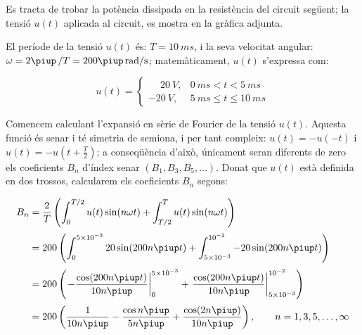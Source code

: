 \begin{exemple}\label{ex:fourier}
     Es tracta de trobar la potència
     dissipada en la resistència del circuit següent; la tensió $u(t)$ aplicada al circuit,
     es mostra en la gràfica adjunta.

    \begin{center}
        
    \end{center}

     El període de la tensió $u(t)$ és: $T=\qty{10}{ms}$, i la
    seva velocitat angular: $\omega = 2\piup\,/T = 200\piup\unit{\,rad/s}$;
    matemàticament, $u(t)$ s'expressa com:

    \[
    u(t) = \begin{cases} \phantom{-}\qty{20}{V}, & \qty{0}{ms} < t < \qty{5}{ms} \\
           \qty{-20}{V}, & \qty{5}{ms} \leq t \leq \qty{10}{ms} \end{cases}
    \]

    Comencem calculant l'expansió en sèrie de Fourier de la tensió
    $u(t)$. Aquesta funció és senar i té simetria de semiona, i per tant
     compleix: $u(t)=-u(-t)$ i $u(t) = -u(t+\frac{T}{2})$; a conseqüència   d'això, únicament seran diferents de zero els coeficients $B_n$ d'índex senar $(B_1,B_3,B_5,\ldots)$. Donat que
    $u(t)$ està definida en dos trossos, calcularem els coeficients
    $B_n$ segons:

    \[
    \begin{split}
        B_n &= \frac{2}{T} \left( \int_0^{T/2} u(t) \sin(n \omega t) +
        \int_{T/2}^{T} u(t) \sin(n \omega t) \right) \\[0.5ex]
        &= 200 \left( \int_0^{5\times 10^{-3}} 20 \sin(200 n \piup t) +
        \int_{5\times 10^{-3}}^{10^{-2}} -20 \sin(200 n \piup t) \right) \\[0.5ex]
        &= 200 \left( \left. -\frac{\cos(200 n \piup t)}{10 n \piup}\right|_0^{5\times 10^{-3}}
        +  \left.\frac{\cos(200 n \piup t)}{10 n \piup}\right|_{5\times
        10^{-3}}^{10^{-2}}\right) \\[0.5ex]
        &= 200\left( \frac{1}{10 n \piup} - \frac{\cos n \piup}{5 n \piup} +
        \frac{\cos (2 n \piup)}{10 n \piup}\right),
        \qquad n=1,3,5,\ldots,\infty
    \end{split}
    \]


\end{exemple}
